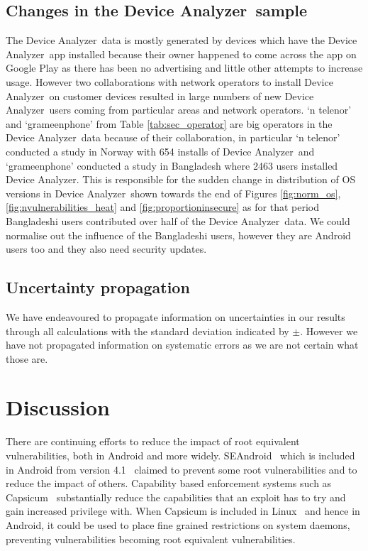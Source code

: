 \documentclass[conference,a4paper,twoside]{IEEEtran}
\newcommand{\da}{Device Analyzer}
\begin{document}
\subsection{Changes in the \da\ sample}
The \da\ data is mostly generated by devices which have the \da\ app installed because their owner happened to come across the app on Google Play as there has been no advertising and little other attempts to increase usage.
However two collaborations with network operators to install \da\ on customer devices resulted in large numbers of new \da\ users coming from particular areas and network operators.
`n telenor' and `grameenphone' from Table \ref{tab:sec_operator} are big operators in the \da\ data because of their collaboration, in particular `n telenor' conducted a study in Norway with 654 installs of \da\ and `grameenphone' conducted a study in Bangladesh where 2463 users installed \da.
This is responsible for the sudden change in distribution of OS versions in \da\ shown towards the end of Figures \ref{fig:norm_os}, \ref{fig:nvulnerabilities_heat} and \ref{fig:proportioninsecure} as for that period Bangladeshi users contributed over half of the \da\ data.
We could normalise out the influence of the Bangladeshi users, however they are Android users too and they also need security updates.


\subsection{Uncertainty propagation}
We have endeavoured to propagate information on uncertainties in our results through all calculations with the standard deviation indicated by $\pm$.
However we have not propagated information on systematic errors as we are not certain what those are.

\section{Discussion}
There are continuing efforts to reduce the impact of root equivalent vulnerabilities, both in Android and more widely.
SEAndroid~\cite{Smalley2013} which is included in Android from version 4.1~\cite{jelly-bean-release} claimed to prevent some root vulnerabilities and to reduce the impact of others.
Capability based enforcement systems such as Capsicum~\cite{Watson2010} substantially reduce the capabilities that an exploit has to try and gain increased privilege with.
When Capsicum is included in Linux~\cite{TODO} and hence in Android, it could be used to place fine grained restrictions on system daemons, preventing vulnerabilities becoming root equivalent vulnerabilities.
\end{document}
